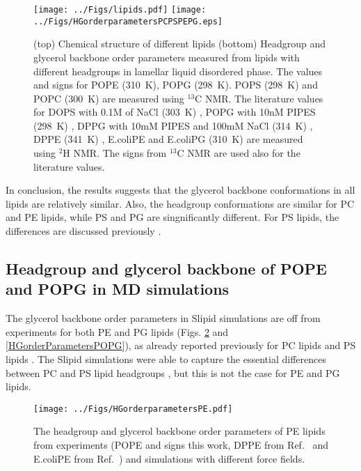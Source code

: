 \documentclass[aps,prl,superscriptaddress,twocolumn]{revtex4}
\begin{document}
\begin{figure}[]
  \centering
  \texttt{[image: ../Figs/lipids.pdf]}
  \texttt{[image: ../Figs/HGorderparametersPCPSPEPG.eps]}
  \caption{\label{HGorderParameters}
    (top) Chemical structure of different lipids
    (bottom) Headgroup and glycerol backbone order parameters measured from lipids
    with different headgroups in lamellar liquid disordered phase.
    The values and signs for POPE (310~K), POPG (298~K). POPS (298~K) \cite{NMRlipidsIVps} and POPC (300~K) \cite{ferreira13,ferreira16}
    are measured using $^{13}$C NMR. The literature values for
    DOPS with 0.1M of NaCl (303~K) \cite{browning80},
    POPG with 10nM PIPES (298~K) \cite{borle85},
    DPPG with 10mM PIPES and 100mM NaCl (314~K) \cite{wohlgemuth80}, 
    DPPE (341~K) \cite{seelig76},
    E.coliPE and E.coliPG (310~K) \cite{gally81}
    are measured using $^2$H NMR. The signs from $^{13}$C NMR are used also for the literature values.
  }
\end{figure}

In conclusion, the results suggests that the glycerol backbone conformations in all lipids are
relatively similar. Also, the headgroup conformations are similar for PC and PE lipids, while
PS and PG are singnificantly different. For PS lipids, the differences are discussed previously \cite{??}.

\subsection{Headgroup and glycerol backbone of POPE and POPG in MD simulations}

The glycerol backbone order parameters in Slipid simulations are off from experiments
for both PE and PG lipids (Figs. \ref{HGorderParametersPE} and \ref{HGorderParametersPOPG}),
as already reported previously for PC lipids \cite{botan15} and PS lipids \cite{NMRlipidsIVps}.
The Slipid simulations were able to capture the essential differences between PC and PS lipid
headgroups \cite{NMRlipidsIVps}, but this is not the case for PE and PG lipids.
 \begin{figure}[]
  \centering
  \texttt{[image: ../Figs/HGorderparametersPE.pdf]}
  \caption{\label{HGorderParametersPE}
    The headgroup and glycerol backbone order parameters of PE lipids
    from experiments (POPE and signs this work, DPPE from Ref.~
    and E.coliPE from Ref.~) and simulations with different force fields.
  }
\end{figure}
\end{document}
